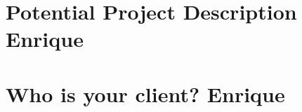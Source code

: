 \documentclass[12pt]{article}
\begin{document}
\section{Potential Project Description Enrique}

\section{Who is your client? Enrique}
\end{document}
